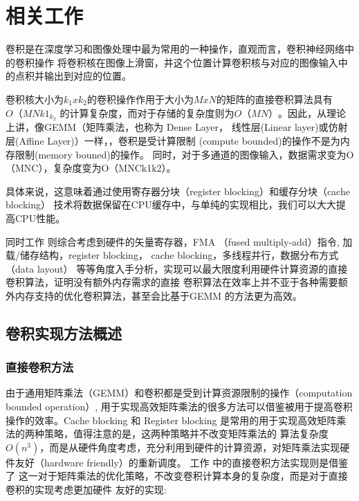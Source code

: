 
\chapter{相关工作}

卷积是在深度学习和图像处理中最为常用的一种操作，直观而言，卷积神经网络中的卷积操作
将卷积核在图像上滑窗，并这个位置计算卷积核与对应的图像输入中的点积并输出到对应的位置。

卷积核大小为$k_1xk_2$的卷积操作作用于大小为$MxN$的矩阵的直接卷积算法具有$O（MNk1_k_2$
的计算复杂度，而对于存储的复杂度则为$O（MN）$。因此，从理论上讲，像GEMM（矩阵乘法，也称为
Dense Layer， 线性层(Linear layer)或仿射层(Affine Layer)）一样，，卷积是受计算限制
(compute bounded)的操作不是为内存限制(memory bouned)的操作。
同时，对于多通道的图像输入，数据需求变为O（MNC），复杂度变为O（MNCk1k2）。

具体来说，这意味着通过使用寄存器分块（register blocking）和缓存分块（cache blocking）
技术将数据保留在CPU缓存中，与单纯的实现相比，我们可以大大提高CPU性能。

同时工作\cite{Zhang2018HighPZ} 则综合考虑到硬件的矢量寄存器，FMA （fused multiply-add）指令,
加载/储存结构，register blocking， cache blocking，多线程并行，数据分布方式（data layout）
等等角度入手分析，实现可以最大限度利用硬件计算资源的直接卷积算法，证明没有额外内存需求的直接
卷积算法在效率上并不亚于各种需要额外内存支持的优化卷积算法，甚至会比基于GEMM 的方法更为高效。

\section{卷积实现方法概述}

\subsection{直接卷积方法}

由于通用矩阵乘法（GEMM）和卷积都是受到计算资源限制的操作（computation bounded operation）,
用于实现高效矩阵乘法的很多方法可以借鉴被用于提高卷积操作的效率。Cache blocking 和 Register
blocking 是常用的用于实现高效矩阵乘法的两种策略，值得注意的是，这两种策略并不改变矩阵乘法的
算法复杂度$O(n^3)$，而是从硬件角度考虑，充分利用到硬件的计算资源，对矩阵乘法实现硬件友好（hardware
friendly）的重新调度。 工作\cite{Georganas2018AnatomyOH} 中的直接卷积方法实现则是借鉴了
这一对于矩阵乘法的优化策略，不改变卷积计算本身的复杂度，而是对于直接卷积的实现考虑更加硬件
友好的实现:

